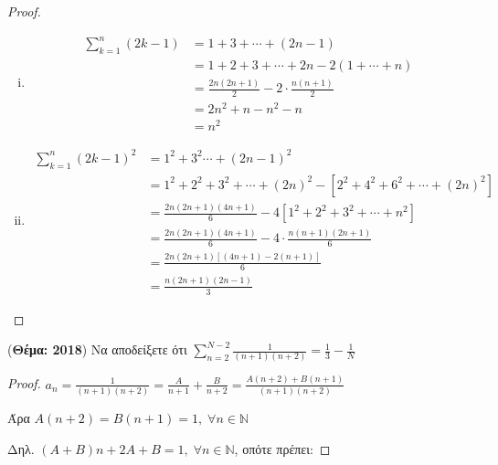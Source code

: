 \begin{multicols}{2}
\begin{enumerate}
        \begin{proof}
        \item {}
            \begin{enumerate}[i)]
                \item \begin{align*}
                \sum_{k=1}^{n} (2k-1) &= 1 + 3 + \cdots + (2n-1) \\
                                      &=1 + 2 + 3 +\cdots +2n - 2(1+\cdots +n) \\
                                      &= \frac{2n(2n+1)}{2}-2 \cdot \frac{n(n+1)}{2} \\
                                      &=2n^{2}+n-n^{2}-n \\
                                      &=n^{2}
            \end{align*}

        \item \begin{align*}
                \sum_{k=1}^{n} (2k-1)^{2} 
                &=1^{2}+3^{2}\cdots + (2n-1)^{2} \\
                &=1^{2}+2^{2}+3^{2}+\cdots +(2n)^{2}-[2^{2}+4^{2}+6^{2}+\cdots +
                (2n)^{2}] \\
                &= \frac{2n(2n+1)(4n+1)}{6} - 4[1^{2}+2^{2}+3^{2}+\cdots +n^{2}] \\
                &= \frac{2n(2n+1)(4n+1)}{6} - 4 \cdot \frac{n(n+1)(2n+1)}{6} \\
                &= \frac{2n(2n+1)[(4n+1)-2(n+1)]}{6} \\
                &= \frac{n(2n+1)(2n-1)}{3} 
        \end{align*}
            \end{enumerate}
        \end{proof}

    \item \label{ask:thema18sum} \textcolor{Col1}{({\bfseries Θέμα: 2018}) 
        Να αποδείξετε ότι $ \sum_{n=2}^{N-2} \frac{1}{(n+1)(n+2)} 
        = \frac{1}{3} - \frac{1}{N} $}

        \begin{proof}
        \item {}
            $ a_n = \frac{1}{(n+1)(n+2)} = \frac{A}{n+1} + \frac{B}{n+2} = 
            \frac{A(n+2)+B(n+1)}{(n+1)(n+2)} $

            Άρα $A(n+2) = B(n+1) = 1, \; \forall n \in \mathbb{N}$

            Δηλ. $ (A+B)n+2A+B=1, \; \forall n \in \mathbb{N} $, οπότε πρέπει:


\end{proof}
\end{enumerate}
\end{multicols}
